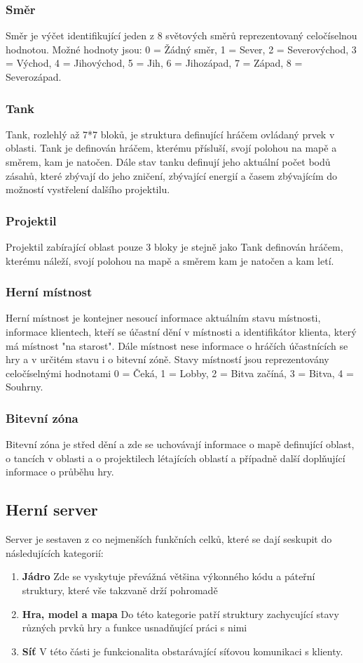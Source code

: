 \documentclass[12pt,a4paper]{article}
\begin{document}
\subsubsection*{Směr}
Směr je výčet identifikující jeden z 8 světových směrů reprezentovaný celočíselnou hodnotou. Možné hodnoty jsou: 0 = Žádný směr, 1 = Sever, 2 = Severovýchod, 3 = Východ, 4 = Jihovýchod, 5 = Jih, 6 = Jihozápad, 7 = Západ, 8 = Severozápad.
\subsubsection*{Tank}
Tank, rozlehlý až 7*7 bloků, je struktura definující hráčem ovládaný prvek v oblasti. Tank je definován hráčem, kterému přísluší, svojí polohou na mapě a směrem, kam je natočen. Dále stav tanku definují jeho aktuální počet bodů zásahů, které zbývají do jeho zničení, zbývající energií a časem zbývajícím do možností vystřelení dalšího projektilu.
\subsubsection*{Projektil}
Projektil zabírající oblast pouze 3 bloky je stejně jako Tank definován hráčem, kterému náleží, svojí polohou na mapě a směrem kam je natočen a kam letí.
\subsubsection*{Herní místnost}
Herní místnost je kontejner nesoucí informace aktuálním stavu místnosti, informace klientech, kteří se účastní dění v místnosti a identifikátor klienta, který má místnost "na starost". Dále místnost nese informace o hráčích účastnících se hry a v určitém stavu i o bitevní zóně.
Stavy místností jsou reprezentovány celočíselnými hodnotami 0 = Čeká, 1 = Lobby, 2 = Bitva začíná, 3 = Bitva, 4 = Souhrny.
\subsubsection*{Bitevní zóna}
Bitevní zóna je střed dění a zde se uchovávají informace o mapě definující oblast, o tancích v oblasti a o projektilech létajících oblastí a případně další doplňující informace o průběhu hry.

\newpage
\subsection{Herní server}
Server je sestaven z co nejmenších funkčních celků, které se dají seskupit do následujících kategorií: 
\begin{enumerate}
\item \textbf{Jádro}
Zde se vyskytuje převážná většina výkonného kódu a páteřní struktury, které vše takzvaně drží pohromadě
\item \textbf{Hra, model a mapa}
Do této kategorie patří struktury zachycující stavy různých prvků hry a funkce usnadňující práci s nimi
\item \textbf{Síť}
V této části je funkcionalita obstarávající síťovou komunikaci s klienty.
\end{enumerate}
\end{document}
